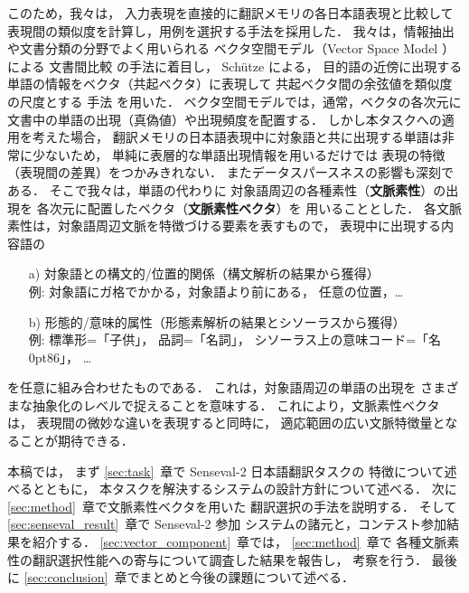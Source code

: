 このため，我々は，
入力表現を直接的に翻訳メモリの各日本語表現と比較して
表現間の類似度を計算し，用例を選択する手法を採用した．
我々は，情報抽出や文書分類の分野でよく用いられる
ベクタ空間モデル（Vector Space Model
）による
文書間比較\cite{salton:83} の手法に着目し，
Sch\"utze による，
目的語の近傍に出現する単語の情報をベクタ（共起ベクタ）に表現して
共起ベクタ間の余弦値を類似度の尺度とする
手法\cite{schutze:97} を用いた．
ベクタ空間モデルでは，通常，ベクタの各次元に
文書中の単語の出現（真偽値）や出現頻度を配置する．
しかし本タスクへの適用を考えた場合，
翻訳メモリの日本語表現中に対象語と共に出現する単語は非常に少ないため，
単純に表層的な単語出現情報を用いるだけでは
表現の特徴（表現間の差異）をつかみきれない．
またデータスパースネスの影響も深刻である．
そこで我々は，単語の代わりに
対象語周辺の各種素性（{\bf 文脈素性}）の出現を
各次元に配置したベクタ（{\bf 文脈素性ベクタ}）を
用いることとした． 
各文脈素性は，対象語周辺文脈を特徴づける要素を表すもので，
表現中に出現する内容語の
\begin{enumerate}
 \item[a)] 対象語との構文的/位置的関係（構文解析の結果から獲得）\\
	   例: 対象語にガ格でかかる，対象語より前にある，
	       任意の位置，\ldots
 \item[b)] 形態的/意味的属性（形態素解析の結果とシソーラスから獲得）\\
	   例: 標準形=\hspace*{-.25zw}「子供」，
	       品詞=\hspace*{-.25zw}「名詞」，
	       シソーラス上の意味コード=\hspace*{-.25zw}「名\kern0pt86」，
	       \ldots
\end{enumerate}
を任意に組み合わせたものである．
これは，対象語周辺の単語の出現を
さまざまな抽象化のレベルで捉えることを意味する．
これにより，文脈素性ベクタは，
表現間の微妙な違いを表現すると同時に，
適応範囲の広い文脈特徴量となることが期待できる．

本稿では，
まず \ref{sec:task}~章で {\sc Senseval}-2 日本語翻訳タスクの
特徴について述べるとともに，
本タスクを解決するシステムの設計方針について述べる．
次に \ref{sec:method}~章で文脈素性ベクタを用いた
翻訳選択の手法を説明する．
そして \ref{sec:senseval_result}~章で {\sc Senseval}-2 参加
システムの諸元と，コンテスト参加結果を紹介する．
\ref{sec:vector_component}~章では，
\ref{sec:method}~章で
各種文脈素性の翻訳選択性能への寄与について調査した結果を報告し，
考察を行う．
最後に \ref{sec:conclusion}~章でまとめと今後の課題について述べる．



